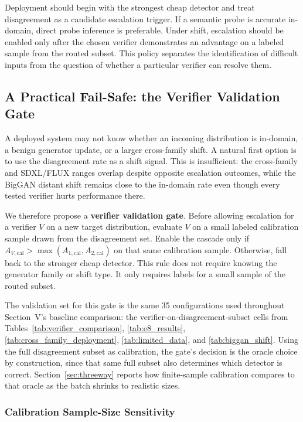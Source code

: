 \documentclass{ieeeaccess}
\begin{document}
Deployment should begin with the strongest cheap detector and treat disagreement as a
candidate escalation trigger. If a semantic probe is accurate in-domain, direct probe
inference is preferable. Under shift, escalation should be enabled only after the chosen
verifier demonstrates an advantage on a labeled sample from the routed subset. This
policy separates the identification of difficult inputs from the question of whether a
particular verifier can resolve them.

\subsection{A Practical Fail-Safe: the Verifier Validation Gate}
\label{sec:validation_gate}

A deployed system may not know whether an incoming distribution is in-domain, a benign
generator update, or a larger cross-family shift. A natural first option is to use the
disagreement rate as a shift signal. This is insufficient: the cross-family and
SDXL/FLUX ranges overlap despite opposite escalation outcomes, while the BigGAN distant
shift remains close to the in-domain rate even though every tested verifier hurts
performance there.

We therefore propose a \textbf{verifier validation gate}. Before allowing escalation for
a verifier $V$ on a new target distribution, evaluate $V$ on a small labeled calibration
sample drawn from the disagreement set. Enable the cascade only if
$A_{V,\text{cal}} > \max(A_{1,\text{cal}}, A_{2,\text{cal}})$ on that same calibration
sample. Otherwise, fall back to the stronger cheap detector. This rule does not require
knowing the generator family or shift type. It only requires labels for a small sample of
the routed subset.

The validation set for this gate is the same 35 configurations used
throughout Section~V's baseline comparison: the verifier-on-disagreement-subset
cells from Tables~\ref{tab:verifier_comparison}, \ref{tab:e8_results},
\ref{tab:cross_family_deployment}, \ref{tab:limited_data}, and
\ref{tab:biggan_shift}. Using the full disagreement subset as calibration, the gate's decision is
the oracle choice by construction, since that same full subset also
determines which detector is correct. Section~\ref{sec:threeway} reports
how finite-sample calibration compares to that oracle as the batch shrinks
to realistic sizes.

\subsubsection{Calibration Sample-Size Sensitivity}
\end{document}
